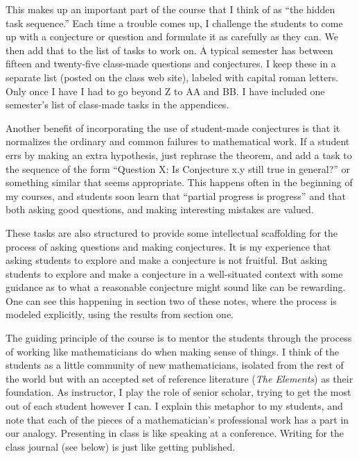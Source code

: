 \begin{annotation}
This makes up an important part of the course that I think of as ``the hidden task sequence.'' Each time a trouble comes up, I challenge the students to come up with a conjecture or question and formulate it as carefully as they can. We then add that to the list of tasks to work on. A typical semester has between fifteen and twenty-five class-made questions and conjectures. I keep these in a separate list (posted on the class web site), labeled with capital roman letters. Only once I have I had to go beyond Z to AA and BB. I have included one semester's list of class-made tasks in the appendices.

Another benefit of incorporating the use of student-made conjectures is that it normalizes the ordinary and common failures to mathematical work. If a student errs by making an extra hypothesis, just rephrase the theorem, and add a task to the sequence of the form ``Question X: Is Conjecture x.y still true in general?'' or something similar that seems appropriate. This happens often in the beginning of my courses, and students soon learn that ``partial progress is progress'' and that both asking good questions, and making interesting mistakes are valued.

These tasks are also structured to provide some intellectual scaffolding for the process of asking questions and making conjectures. It is my experience that asking students to explore and make a conjecture is not fruitful. But asking students to explore and make a conjecture in a well-situated context with some guidance as to what a reasonable conjecture might sound like can be rewarding. One can see this happening in section two of these notes, where the process is modeled explicitly, using the results from section one.

The guiding principle of the course is to mentor the students through the process of working like mathematicians do when making sense of things. I think of the students as a little community of new mathematicians, isolated from the rest of the world but with an accepted set of reference literature (\emph{The Elements}) as their foundation. As instructor, I play the role of senior scholar, trying to get the most out of each student however I can. I explain this metaphor to my students, and note that each of the pieces of a mathematician's professional work has a part in our analogy. Presenting in class is like speaking at a conference. Writing for the class journal (see below) is just like getting published.


\end{annotation}
